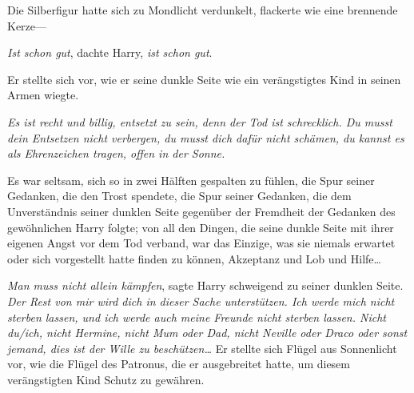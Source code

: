 Die Silberfigur hatte sich zu Mondlicht verdunkelt, flackerte wie eine brennende Kerze—

\emph{Ist schon gut}, dachte Harry, \emph{ist schon gut}.

Er stellte sich vor, wie er seine dunkle Seite wie ein verängstigtes Kind in seinen Armen wiegte.

\emph{Es ist recht und billig, entsetzt zu sein, denn der Tod ist schrecklich. Du musst dein Entsetzen nicht verbergen, du musst dich dafür nicht schämen, du kannst es als Ehrenzeichen tragen, offen in der Sonne.}

Es war seltsam, sich so in zwei Hälften gespalten zu fühlen, die Spur seiner Gedanken, die den Trost spendete, die Spur seiner Gedanken, die dem Unverständnis seiner dunklen Seite gegenüber der Fremdheit der Gedanken des gewöhnlichen Harry folgte; von all den Dingen, die seine dunkle Seite mit ihrer eigenen Angst vor dem Tod verband, war das Einzige, was sie niemals erwartet oder sich vorgestellt hatte finden zu können, Akzeptanz und Lob und Hilfe…

\emph{Man muss nicht allein kämpfen}, sagte Harry schweigend zu seiner dunklen Seite. \emph{Der Rest von mir wird dich in dieser Sache unterstützen. Ich werde mich nicht sterben lassen, und ich werde auch meine Freunde nicht sterben lassen. Nicht du/ich, nicht Hermine, nicht Mum oder Dad, nicht Neville oder Draco oder sonst jemand, dies ist der Wille zu beschützen…} Er stellte sich Flügel aus Sonnenlicht vor, wie die Flügel des Patronus, die er ausgebreitet hatte, um diesem verängstigten Kind Schutz zu gewähren.

